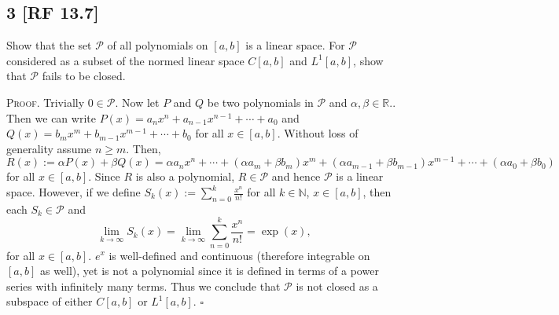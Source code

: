 \documentclass[12pt]{article}
\newcounter{ProofCounter}
\newenvironment{Proof}{\stepcounter{ProofCounter}\textsc{Proof.}}{\hfill$\square$}
\begin{document}
\subsection*{3 [RF 13.7]}
\begin{tcolorbox}
  Show that the set $\mathcal{P}$ of all polynomials on $[a,b]$ is a linear space. For $\mathcal{P}$ considered as a subset of the normed linear
  space $C[a,b]$ and $L^{1}[a,b]$, show that $\mathcal{P}$ fails to be closed.
\end{tcolorbox}
\begin{Proof}
  Trivially $0 \in \mathcal{P}$. Now let $P$ and $Q$ be two polynomials in $\mathcal{P}$ and $\alpha,\beta \in \mathbb{R}$.. Then we can write 
  $P(x) = a_n x^{n} + a_{n-1}x^{n-1} + \cdots + a_{0}$ and $Q(x) = b_{m} x^{m} + b_{m-1}x^{m-1} + \cdots + b_{0}$
  for all $x \in [a,b]$. Without loss of generality assume $n \geq m$. Then,
  \[ 
    R(x) := \alpha P(x) + \beta Q(x) = \alpha a_n x^{n} + \cdots + (\alpha a_{m} + \beta b_{m})x^{m} + (\alpha a_{m-1} + \beta b_{m-1})x^{m-1} + \cdots +
    (\alpha a_0 + \beta b_0)
  \]
  for all $x \in [a,b]$. Since $R$ is also a polynomial, $R \in \mathcal{P}$ and hence $\mathcal{P}$ is a linear space. However, if we define $S_k(x) :=
  \sum_{n=0}^{k}\frac{x^{n}}{n!}$ for all $k \in \mathbb{N}$, $x \in [a,b]$, then each $S_k \in \mathcal{P}$ and 
  \[ 
    \lim_{k\rightarrow\infty}S_k(x) = \lim_{k\rightarrow\infty}\sum_{n=0}^{k}\frac{x^{n}}{n!} = \exp(x),
  \]
  for all $x \in [a,b]$. $e^{x}$ is well-defined and continuous (therefore integrable on $[a,b]$ as well), yet is not a polynomial since it is 
  defined in terms of a power series with infinitely many
  terms. Thus we conclude that $\mathcal{P}$ is not closed as a subspace of either $C[a,b]$ or $L^{1}[a,b]$.
\end{Proof}
\end{document}
